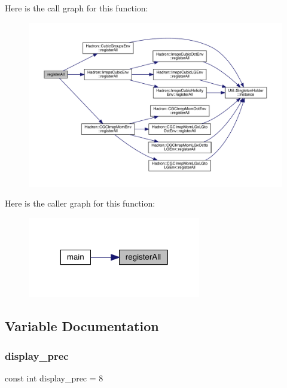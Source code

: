 Here is the call graph for this function\+:
\nopagebreak
\begin{figure}[H]
\begin{center}
\leavevmode
\includegraphics[width=350pt]{d0/d4c/adat-devel_2main_2irreputils_2test__cgs_8cc_a3872416cf70cb24d7da1008a3f3b1d96_cgraph}
\end{center}
\end{figure}
Here is the caller graph for this function\+:
\nopagebreak
\begin{figure}[H]
\begin{center}
\leavevmode
\includegraphics[width=214pt]{d0/d4c/adat-devel_2main_2irreputils_2test__cgs_8cc_a3872416cf70cb24d7da1008a3f3b1d96_icgraph}
\end{center}
\end{figure}


\subsection{Variable Documentation}
\mbox{\label{adat-devel_2main_2irreputils_2test__cgs_8cc_a473744fa8268c6d49feba30498a6cace}} 
\subsubsection{\texorpdfstring{display\_prec}{display\_prec}}
{\footnotesize\ttfamily const int display\+\_\+prec = 8}

